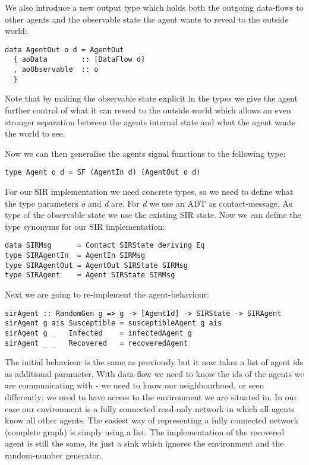 We also introduce a new output type which holds both the outgoing data-flows to other agents and the observable state the agent wants to reveal to the outside world:

\begin{verbatim}
data AgentOut o d = AgentOut
  { aoData        :: [DataFlow d]
  , aoObservable  :: o
  }
\end{verbatim}

Note that by making the observable state explicit in the types we give the agent further control of what it can reveal to the outside world which allows an even stronger separation between the agents internal state and what the agent wants the world to see.

Now we can then generalise the agents signal functions to the following type:
\begin{verbatim}
type Agent o d = SF (AgentIn d) (AgentOut o d)
\end{verbatim}

For our SIR implementation we need concrete types, so we need to define what the type parameters \textit{o} and \textit{d} are. For \textit{d} we use an ADT as contact-message. As type of the observable state we use the existing SIR state. Now we can define the type synonyms for our SIR implementation:
\begin{verbatim}
data SIRMsg      = Contact SIRState deriving Eq
type SIRAgentIn  = AgentIn SIRMsg
type SIRAgentOut = AgentOut SIRState SIRMsg
type SIRAgent    = Agent SIRState SIRMsg
\end{verbatim}

Next we are going to re-implement the agent-behaviour:

\begin{verbatim}
sirAgent :: RandomGen g => g -> [AgentId] -> SIRState -> SIRAgent
sirAgent g ais Susceptible = susceptibleAgent g ais
sirAgent g _   Infected    = infectedAgent g
sirAgent _ _   Recovered   = recoveredAgent
\end{verbatim}

The initial behaviour is the same as previously but it now takes a list of agent ids as additional parameter. With data-flow we need to know the ids of the agents we are communicating with - we need to know our neighbourhood, or seen differently: we need to have access to the environment we are situated in. In our case our environment is a fully connected read-only network in which all agents know all other agents. The easiest way of representing a fully connected network (complete graph) is simply using a list. 
The implementation of the recovered agent is still the same, its just a sink which ignores the environment and the random-number generator. 

